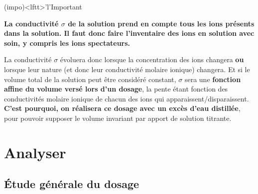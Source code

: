 \documentclass[../main/main.tex]{subfiles}
\begin{document}
{	\begin{tcb}(impo)<lftt>'l'{Important}
		\begin{center}
			\bfseries
			La conductivité $\sigma$ de la solution prend en compte tous les ions
			présents dans la solution. Il faut donc faire l'inventaire des ions en
			solution avec soin, y compris les ions spectateurs.
		\end{center}
		La conductivité $\sigma$ évoluera donc lorsque la concentration des ions
		changera \textbf{ou} lorsque leur nature (et donc leur conductivité molaire
		ionique) changera. Et si le volume total de la solution peut être considéré
		constant, $\sigma$ sera une \textbf{fonction affine du volume versé lors
			d'un dosage}, la pente étant fonction des conductivités molaire ionique de
		chacun des ions qui apparaissent/disparaissent. \textbf{C'est pourquoi, on
			réalisera ce dosage avec un excès d'eau distillée}, pour pouvoir supposer le
		volume invariant par apport de solution titrante.
	\end{tcb}
}

\section{Analyser}
\subsection{Étude générale du dosage}


\end{document}

